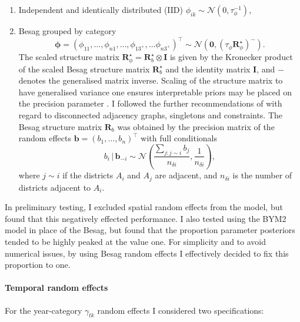 \documentclass[a4paper, nobind]{templates/ociamthesis}
\providecommand{\tightlist}{%
  \setlength{\itemsep}{0pt}\setlength{\parskip}{0pt}}
\newcommand{\N}{\mathcal{N}}
\newcommand{\bphi}{\bm{\phi}}
\begin{document}
\begin{enumerate}
\def\labelenumi{\arabic{enumi}.}
\tightlist
\item
  Independent and identically distributed (IID) \(\phi_{ik} \sim \mathcal{N}(0, \tau_\phi^{-1})\),
\item
  Besag \autocite{besag1991bayesian} grouped by category
  \[
  \bphi = (\phi_{11}, \ldots, \phi_{n1}, \ldots, \phi_{1{3^{+}}}, \ldots \phi_{n3^{+}})^\top \sim \mathcal{N}(\mathbf{0}, (\tau_\phi \mathbf{R}^\star_\phi)^{-}).
  \]
  The scaled structure matrix \(\mathbf{R}^\star_\phi = \mathbf{R}^\star_b \otimes \mathbf{I}\) is given by the Kronecker product of the scaled Besag structure matrix \(\mathbf{R}^\star_b\) and the identity matrix \(\mathbf{I}\), and \({-}\) denotes the generalised matrix inverse.
  Scaling of the structure matrix to have generalised variance one ensures interpretable priors may be placed on the precision parameter \autocite{sorbye2014scaling}.
  I followed the further recommendations of \textcite{freni2018note} with regard to disconnected adjacency graphs, singletons and constraints.
  The Besag structure matrix \(\mathbf{R}_b\) was obtained by the precision matrix of the random effects \(\mathbf{b} = (b_1, \ldots, b_n)^\top\) with full conditionals
  \begin{equation}
  b_i \, | \, \mathbf{b}_{-i} \sim \N\left(\frac{\sum_{j: j \sim i} b_j}{n_{\delta i}}, \frac{1}{n_{\delta i}}\right),
  \end{equation}
  where \(j \sim i\) if the districts \(A_i\) and \(A_j\) are adjacent, and \(n_{\delta i}\) is the number of districts adjacent to \(A_i\).
\end{enumerate}

In preliminary testing, I excluded spatial random effects from the model, but found that this negatively effected performance.
I also tested using the BYM2 model \autocite{simpson2017penalising} in place of the Besag, but found that the proportion parameter posteriors tended to be highly peaked at the value one.
For simplicity and to avoid numerical issues, by using Besag random effects I effectively decided to fix this proportion to one.

\hypertarget{temporal-random-effects}{%
\paragraph{Temporal random effects}\label{temporal-random-effects}}

For the year-category \(\gamma_{tk}\) random effects I considered two specifications:
\end{document}
